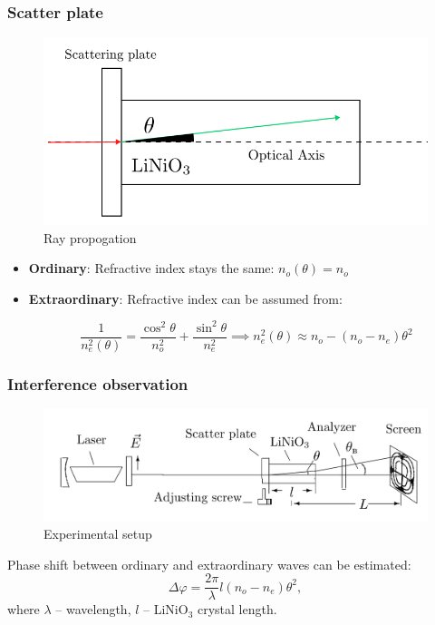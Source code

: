 \documentclass{beamer}
\begin{document}
	
\begin{frame}
	\frametitle{Scatter plate}		
	\begin{figure}
		\footnotesize
		\centering
		\includegraphics[width=0.9\linewidth]{res/theta_propagation}
		\vspace{-5pt}
		\footnotesize
		\caption{\footnotesize Ray propogation}
	\end{figure}
	
	\footnotesize
	\begin{itemize}
		\item[] \textbf{Ordinary}: Refractive index stays the same: $n_o(\theta) = n_o$
		
		\item[] \textbf{Extraordinary}: Refractive index can be assumed from:
		
		$$\frac{1}{n_e^2(\theta)} = \frac{\cos^2{\theta}}{n_o^2} + \frac{\sin^2{\theta}}{n_e^2} \implies n_e^2(\theta) \approx n_o - (n_o - n_e) \theta^2$$
	\end{itemize}	
\end{frame}

\begin{frame}
	\frametitle{Interference observation}
	
	\begin{figure}
		\centering
		\includegraphics[width=1\linewidth]{res/scheme}
		\caption{Experimental setup}
	\end{figure}
	
	Phase shift between ordinary and extraordinary waves can be estimated:
	$$
	\Delta \varphi = \frac{2\pi}{\lambda}l(n_o - n_e)\theta^2,
	$$
	where $\lambda$ -- wavelength, $l$ -- LiNiO$_3$ crystal length.
\end{frame}
\end{document}

